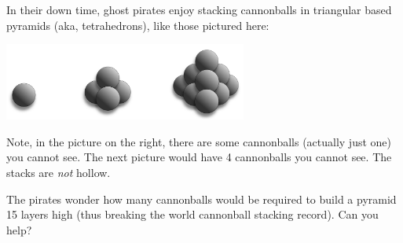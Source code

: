 \begin{questions}
\begin{parts}
\end{parts}


\question In their down time, ghost pirates enjoy stacking cannonballs in triangular based pyramids (aka, tetrahedrons), like those pictured here:

\centerline{\includegraphics[height=1in]{images/cannonballs.png}}

Note, in the picture on the right, there are some cannonballs (actually just one) you cannot see. The next picture would have 4 cannonballs you cannot see.  The stacks are \emph{not} hollow. 

The pirates wonder how many cannonballs would be required to build a pyramid 15 layers high (thus breaking the world cannonball stacking record).  Can you help?

\end{questions}
